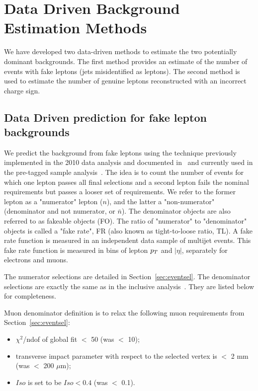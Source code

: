 \section{Data Driven Background Estimation Methods}
\label{sec:datadriven}

We have developed two data-driven methods to 
estimate the two potentially dominant backgrounds.
The first method provides an estimate of the number of events with fake leptons (jets misidentified as leptons).
The second method is used to estimate the number of genuine leptons reconstructed with an incorrect charge sign.

\subsection{Data Driven prediction for fake lepton backgrounds}
\label{sec:fakes}

We predict the background from fake leptons using the technique previously implemented in the 2010 data analysis
and documented in~\cite{frmethod} and currently used in the pre-tagged sample analysis~\cite{ssnote2011}.
The idea is to count the number of events for which one lepton passes all final selections and a second lepton
fails the nominal requirements but passes a looser set of requirements. 
We refer to the former lepton as a "numerator" lepton ($n$),
and the latter a "non-numerator" (denominator and not numerator, or $\bar{n}$).
The denominator objects are also referred to as fakeable objects (FO).
The ratio of "numerator" to "denominator" objects is called a "fake rate",
 FR (also known as tight-to-loose ratio, TL).  
A fake rate function is measured in an independent data sample of multijet events.
This fake rate function is measured in bins of lepton $p_T$ and $|\eta |$,
separately for electrons and muons. 

The numerator selections are detailed in Section~\ref{sec:eventsel}. 
The denominator selections are exactly the same as in the inclusive analysis~\cite{ssnote2011}.
They are listed below for completeness.

Muon denominator definition is to relax the following muon requirements from
Section~\ref{sec:eventsel}:
\begin{itemize}
\item $\chi^2$/ndof of global fit $<$ 50 (was $<$ 10);
\item transverse impact parameter with respect to the selected vertex is
$<$ 2 mm (was $<$ 200 $\mu$m);
\item $Iso$ is set to be $Iso < 0.4$  (was $<$ 0.1).
\end{itemize}

